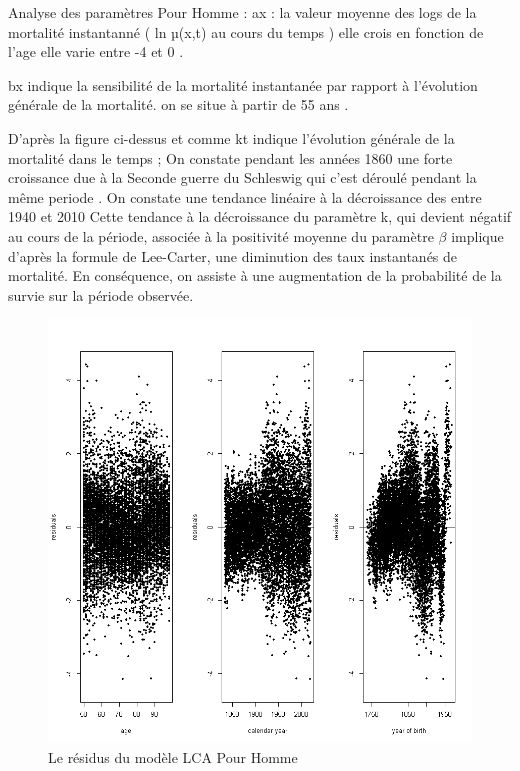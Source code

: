 Analyse des paramètres Pour Homme : ax : la valeur moyenne des logs de la mortalité instantanné ( ln µ(x,t) au cours du temps ) elle crois en fonction de l’age elle varie entre -4 et 0 .

bx indique la sensibilité de la mortalité instantanée par rapport à l’évolution générale de la mortalité. on se situe à partir de 55 ans .

D’après la figure ci-dessus et comme kt indique l’évolution générale de la mortalité dans le temps ; On constate pendant les années 1860 une forte croissance due à la Seconde guerre du Schleswig qui c'est déroulé pendant la même periode . On constate une tendance linéaire à la décroissance des entre 1940 et 2010 Cette tendance à la décroissance du paramètre k, qui devient négatif au cours de la période, associée à la positivité moyenne du paramètre $\beta$ implique d’après la formule de Lee-Carter, une diminution des taux instantanés de mortalité. En conséquence, on assiste à une augmentation de la probabilité de la survie sur la période observée.

\begin{figure}[!htb]
 \caption{Le résidus du modèle LCA Pour Homme}
    \centering
    \includegraphics[scale =0.9]{output_9_1.png}
\end{figure}


